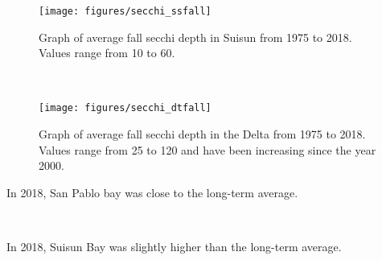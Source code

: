 \documentclass[
]{book}
\begin{document}
\begin{panel-grid}
\begin{columns-nocenter}
\begin{column800}

\begin{expand}

\begin{figure}
\texttt{[image: figures/secchi\_ssfall]} \caption{Graph of average fall secchi depth in Suisun from 1975 to 2018. Values range from 10 to 60.}\label{fig:unnamed-chunk-97}
\end{figure}

\end{expand}

\end{column800}

\begin{column40}

~

\end{column40}

\begin{column800}

\begin{expand}

\begin{figure}
\texttt{[image: figures/secchi\_dtfall]} \caption{Graph of average fall secchi depth in the Delta from 1975 to 2018. Values range from 25 to 120 and have been increasing since the year 2000.}\label{fig:unnamed-chunk-98}
\end{figure}

\end{expand}

\end{column800}

\end{columns-nocenter}

\begin{columns-nocenter}

\begin{column800}

In 2018, San Pablo bay was close to the long-term average.

\end{column800}

\begin{column40}

~

\end{column40}

\begin{column800}

In 2018, Suisun Bay was slightly higher than the long-term average.


\end{column800}
\end{columns-nocenter}
\end{panel-grid}
\end{document}
